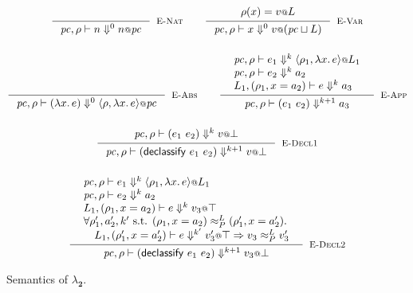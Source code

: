 \documentclass{article}
\makeatletter
\newcommand{\at}{\ensuremath{{\scriptstyle{@}}}}
\newcommand{\pc}{\ensuremath{{\mathit{pc}}}}
\theoremstyle{definition}
\makeatother
\begin{document}
\begin{figure}[ht]
  \centering
  \begin{gather*}
    \inference{}{
      \pc, \rho |- n \Downarrow^{0} n \at \pc
    }[\textsc{E-Nat}]
    \qquad
    \inference{
      {\begin{array}{l}
          \rho(x) = v \at L
        \end{array}}
    }{
      \pc, \rho |- x \Downarrow^{0} v \at (\pc \sqcup L)
    }[\textsc{E-Var}]
    \\[3ex]
    \inference{}{
      \pc, \rho |- (\lambda{x}.\, e) \Downarrow^{0}
      \langle{\rho, \lambda{x}.\, e\rangle} \at \pc
    }[\textsc{E-Abs}]
    \qquad
    \inference{
      {\begin{array}{l}
          \pc, \rho |- e_1 \Downarrow^{k}
          \langle{\rho_1, \lambda{x}.\, e\rangle} \at L_1
          \\
          \pc, \rho |- e_2 \Downarrow^{k} a_2
          \\
          L_1, (\rho_1, x = a_2) |- e \Downarrow^{k} a_3
        \end{array}}
    }{
      \pc, \rho |- (e_1\ e_2) \Downarrow^{k+1} a_3
    }[\textsc{E-App}]
    \\[3ex]
    \inference{
      {\begin{array}{l}
          \pc, \rho |- (e_1\ e_2) \Downarrow^{k} v \at \bot
        \end{array}}
    }{
      \pc, \rho |- (\mathsf{declassify}\ e_1\ e_2) \Downarrow^{k+1} v \at \bot
    }[\textsc{E-Decl1}]
    \\[3ex]
    \inference{
      {\begin{array}{l}
          \pc, \rho |- e_1 \Downarrow^{k}
          \langle{\rho_1, \lambda{x}.\, e\rangle} \at L_1
          \\
          \pc, \rho |- e_2 \Downarrow^{k} a_2
          \\
          L_1, (\rho_1, x = a_2) |- e \Downarrow^{k} v_3 \at \top
          \\
          \forall{\rho_1', a_2', k' \text{ s.t. }
            (\rho_1, x = a_2) \approx^{L}_{P} (\rho_1', x = a_2')}.\,
          \\\quad
          L_1, (\rho_1', x = a_2') |- e \Downarrow^{k'} v_3' \at \top =>
          v_3 \approx^{L}_{P} v_3'
        \end{array}}
    }{
      \pc, \rho |- (\mathsf{declassify}\ e_1\ e_2) \Downarrow^{k+1} v_3 \at \bot
    }[\textsc{E-Decl2}]
  \end{gather*}
  \caption{Semantics of $\lambda_{\mathbf{2}}$.}
  \label{fig:semantics}
\end{figure}
\end{document}
